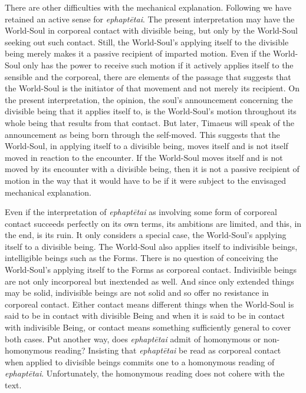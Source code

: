 There are other difficulties with the mechanical explanation. Following \citet{Betegh:2019fq} we have retained an active sense for \emph{ephaptētai}. The present interpretation may have the World-Soul in corporeal contact with divisible being, but only by the World-Soul seeking out such contact. Still, the World-Soul's applying itself to the divisible being merely makes it a passive recipient of imparted motion. Even if the World-Soul only has the power to receive such motion if it actively applies itself to the sensible and the corporeal, there are elements of the passage that suggests that the World-Soul is the initiator of that movement and not merely its recipient. On the present interpretation, the opinion, the soul's announcement concerning the divisible being that it applies itself to, is the World-Soul's motion throughout its whole being that results from that contact. But later, Timaeus will speak of the announcement as being born through the self-moved. This suggests that the World-Soul, in applying itself to a divisible being, moves itself and is not itself moved in reaction to the encounter. If the World-Soul moves itself and is not moved by its encounter with a divisible being, then it is not a passive recipient of motion in the way that it would have to be if it were subject to the envisaged mechanical explanation. 

Even if the interpretation of \emph{ephaptētai} as involving some form of corporeal contact succeeds perfectly on its own terms, its ambitions are limited, and this, in the end, is its ruin. It only considers a special case, the World-Soul's applying itself to a divisible being. The World-Soul also applies itself to indivisible beings, intelligible beings such as the Forms. There is no question of conceiving the World-Soul's applying itself to the Forms as corporeal contact. Indivisible beings are not only incorporeal but inextended as well. And since only extended things may be solid, indivisible beings are not solid and so offer no resistance in corporeal contact. Either contact means different things when the World-Soul is said to be in contact with divisible Being and when it is said to be in contact with indivisible Being, or contact means something sufficiently general to cover both cases. Put another way, does \emph{ephaptētai} admit of homonymous or non-homonymous reading? Insisting that \emph{ephaptētai} be read as corporeal contact when applied to divisible beings commits one to a homonymous reading of \emph{ephaptētai}. Unfortunately, the homonymous reading does not cohere with the text.


